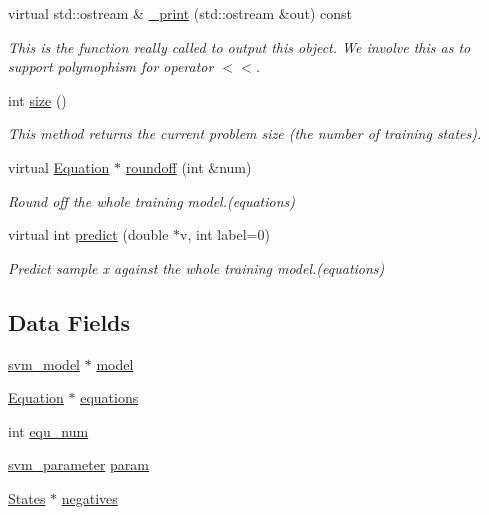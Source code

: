 \begin{DoxyCompactItemize}
virtual std\+::ostream \& \hyperlink{classSVM__I_ab0ae30d86d9f9026908a7b902f7a78e3}{\+\_\+print} (std\+::ostream \&out) const 
\begin{DoxyCompactList}\small\item\em This is the function really called to output this object. We involve this as to support polymophism for operator $<$$<$. \end{DoxyCompactList}\item 
int \hyperlink{classSVM__I_a1b66cefe313cffaa77d4271dfb4b8474}{size} ()
\begin{DoxyCompactList}\small\item\em This method returns the current problem size (the number of training states). \end{DoxyCompactList}\item 
virtual \hyperlink{classEquation}{Equation} $\ast$ \hyperlink{classSVM__I_a91b713ef0810fd4c83a5c711aea9fecf}{roundoff} (int \&num)
\begin{DoxyCompactList}\small\item\em Round off the whole training model.(equations) \end{DoxyCompactList}\item 
virtual int \hyperlink{classSVM__I_abe0a76aa6d31d18c2ee66002c35c813f}{predict} (double $\ast$v, int label=0)
\begin{DoxyCompactList}\small\item\em Predict sample x against the whole training model.(equations) \end{DoxyCompactList}\end{DoxyCompactItemize}
\subsection*{Data Fields}
\begin{DoxyCompactItemize}
\item 
\hyperlink{structsvm__model}{svm\+\_\+model} $\ast$ \hyperlink{classSVM__I_a7b7466c2246c73438ead77631278ff3a}{model}
\item 
\hyperlink{classEquation}{Equation} $\ast$ \hyperlink{classSVM__I_af905b6378094007502fa5d81f018a11b}{equations}
\item 
int \hyperlink{classSVM__I_ab674468eec42010761332da3f9b2f69c}{equ\+\_\+num}
\item 
\hyperlink{structsvm__parameter}{svm\+\_\+parameter} \hyperlink{classSVM__I_afbec56807dada05e9e527587d25acfb6}{param}
\item 
\hyperlink{classStates}{States} $\ast$ \hyperlink{classSVM__I_a8a56898f346ff15c5bb904ff6e001dad}{negatives}
\end{DoxyCompactItemize}
